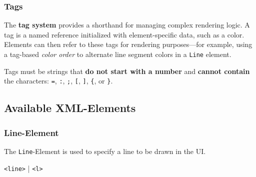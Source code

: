 \documentclass[a4paper,11pt]{article}
\begin{document}
\hypertarget{tag}{}
\subsubsection*{Tags}

The \textbf{tag system} provides a shorthand for managing complex rendering logic. A tag is a named reference initialized with element-specific data, such as a color. Elements can then refer to these tags for rendering purposes—for example, using a tag-based \textit{color order} to alternate line segment colors in a \texttt{Line} element.

Tags must be strings that \textbf{do not start with a number} and \textbf{cannot contain} the characters: \texttt{=}, \texttt{:}, \texttt{;}, \texttt{[}, \texttt{]}, \texttt{\{}, or \texttt{\}}.


\newpage
\subsection*{Available XML-Elements}


\hypertarget{line}{}
\subsubsection*{Line-Element}
The \texttt{Line}-Element is used to specify a line to be drawn in the UI.
\begin{center}
    \texttt{<line>} | \texttt{<l>}
\end{center}
\end{document}
